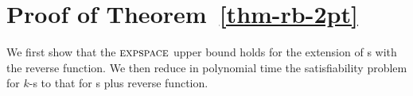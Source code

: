 
\section{Proof of Theorem~\ref{thm-rb-2pt}}\label{app-rb-2pt}

We first show that the $\textsc{expspace}$ upper bound holds for the extension of \PT{}s with the reverse function. We then reduce in polynomial time the satisfiability problem for $k$-\RBPPT{}s to that for \PT{}s plus reverse function.
